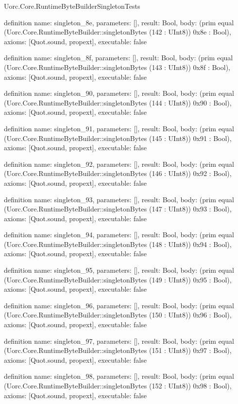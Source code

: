 \begin{lexlean}{Uorc.Core.RuntimeByteBuilderSingletonTests}
\begin{semanticmodule}
definition{
  name: singleton_8e,
  parameters: [],
  result: Bool,
  body: (prim equal (Uorc.Core.RuntimeByteBuilder::singletonBytes (142 : UInt8)) 0x8e : Bool),
  axioms: [Quot.sound, propext],
  executable: false
}

definition{
  name: singleton_8f,
  parameters: [],
  result: Bool,
  body: (prim equal (Uorc.Core.RuntimeByteBuilder::singletonBytes (143 : UInt8)) 0x8f : Bool),
  axioms: [Quot.sound, propext],
  executable: false
}

definition{
  name: singleton_90,
  parameters: [],
  result: Bool,
  body: (prim equal (Uorc.Core.RuntimeByteBuilder::singletonBytes (144 : UInt8)) 0x90 : Bool),
  axioms: [Quot.sound, propext],
  executable: false
}

definition{
  name: singleton_91,
  parameters: [],
  result: Bool,
  body: (prim equal (Uorc.Core.RuntimeByteBuilder::singletonBytes (145 : UInt8)) 0x91 : Bool),
  axioms: [Quot.sound, propext],
  executable: false
}

definition{
  name: singleton_92,
  parameters: [],
  result: Bool,
  body: (prim equal (Uorc.Core.RuntimeByteBuilder::singletonBytes (146 : UInt8)) 0x92 : Bool),
  axioms: [Quot.sound, propext],
  executable: false
}

definition{
  name: singleton_93,
  parameters: [],
  result: Bool,
  body: (prim equal (Uorc.Core.RuntimeByteBuilder::singletonBytes (147 : UInt8)) 0x93 : Bool),
  axioms: [Quot.sound, propext],
  executable: false
}

definition{
  name: singleton_94,
  parameters: [],
  result: Bool,
  body: (prim equal (Uorc.Core.RuntimeByteBuilder::singletonBytes (148 : UInt8)) 0x94 : Bool),
  axioms: [Quot.sound, propext],
  executable: false
}

definition{
  name: singleton_95,
  parameters: [],
  result: Bool,
  body: (prim equal (Uorc.Core.RuntimeByteBuilder::singletonBytes (149 : UInt8)) 0x95 : Bool),
  axioms: [Quot.sound, propext],
  executable: false
}

definition{
  name: singleton_96,
  parameters: [],
  result: Bool,
  body: (prim equal (Uorc.Core.RuntimeByteBuilder::singletonBytes (150 : UInt8)) 0x96 : Bool),
  axioms: [Quot.sound, propext],
  executable: false
}

definition{
  name: singleton_97,
  parameters: [],
  result: Bool,
  body: (prim equal (Uorc.Core.RuntimeByteBuilder::singletonBytes (151 : UInt8)) 0x97 : Bool),
  axioms: [Quot.sound, propext],
  executable: false
}

definition{
  name: singleton_98,
  parameters: [],
  result: Bool,
  body: (prim equal (Uorc.Core.RuntimeByteBuilder::singletonBytes (152 : UInt8)) 0x98 : Bool),
  axioms: [Quot.sound, propext],
  executable: false
}


\end{semanticmodule}
\end{lexlean}
